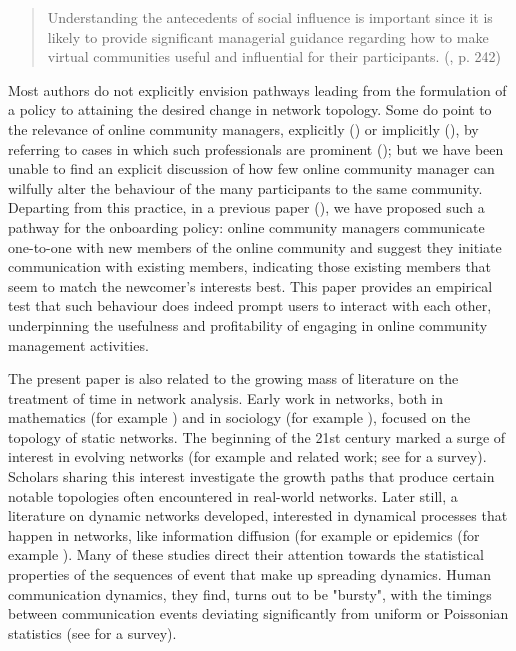 \begin{quotation}
Understanding the antecedents of social influence is important since it is likely to provide significant managerial guidance regarding how to make virtual communities useful and influential for their participants. (\cite{dholakia2004social}, p. 242) 
\end{quotation}

Most authors do not explicitly envision pathways leading from the formulation of a policy to attaining the desired change in network topology. Some do point to the relevance of online community managers, explicitly (\cite{dholakia2004social}) or implicitly (\cite{toral2009empirical}), by referring to cases in which such professionals are prominent (\cite{rheingold1993virtual}); but we have been unable to find an explicit discussion of how few online community manager can wilfully alter the behaviour of the many participants to the same community. Departing from this practice, in a previous paper (\cite{cottica2015online}), we have proposed such a pathway for the onboarding policy: online community managers communicate one-to-one with new members of the online community and suggest they initiate communication with existing members, indicating those existing members that seem to match the newcomer's interests best. This paper provides an empirical test that such behaviour does indeed prompt users to interact with each other, underpinning the usefulness and profitability of engaging in online community management activities.  

The present paper is also related to the growing mass of literature on the treatment of time in network analysis. Early work in networks, both in mathematics (for example \cite{erdds1959random}) and in sociology (for example \cite{moreno1937sociometry}), focused on the topology of static networks. The beginning of the 21st century marked a surge of interest in evolving networks (for example \cite{barabasi1999emergence} and related work; see \cite{dorogovtsev2002evolution} for a survey). Scholars sharing this interest investigate the growth paths that produce certain notable topologies often encountered in real-world networks. Later still, a literature on dynamic networks developed, interested in dynamical processes that happen in networks, like information diffusion (for example \cite{eckmann2004entropy} or epidemics (for example \cite{rocha2011simulated}). Many of these studies direct their attention towards the statistical properties of the sequences of event that make up spreading dynamics. Human communication dynamics, they find, turns out to be "bursty", with the timings between communication events deviating significantly from uniform or Poissonian statistics  (see \cite{holme2012temporal} for a survey). 

